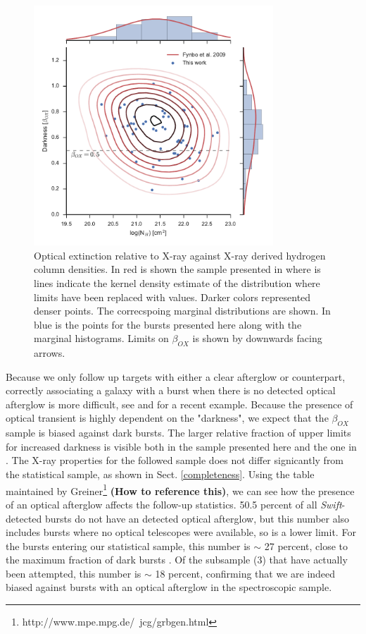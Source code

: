 \documentclass{aa}    %
\newcommand\todo[1]{\textbf{(#1)}}
\begin{document}
\begin{figure}
	\centerline{\includegraphics[width=9cm]{figures/betaOX.pdf}}
	\caption{Optical extinction relative to X-ray against X-ray derived hydrogen
	column densities. In red is shown the sample presented in \citet{Fynbo2009}
	where is lines indicate the kernel density estimate of the distribution where
	limits have been replaced with values. Darker colors represented denser points.
	The correcspoing marginal distributions are shown. In blue is the points for
	the bursts presented here along with the marginal histograms. Limits on
	$\beta_{OX}$ is shown by downwards facing arrows.}
	\label{fig:betaOX}
\end{figure}

Because we only follow up targets with either a clear afterglow or counterpart,
correctly associating a galaxy with a burst when there is no detected optical
afterglow is more difficult, see \citet{Levesque2010} and \citet{Perley2017} for
a recent example. Because the presence of optical transient is highly dependent
on the "darkness", we expect that the $\beta_{OX}$ sample is biased against dark
bursts. The larger relative fraction of upper limits for increased darkness is
visible both in the sample presented here and the one in \citet{Fynbo2009}. The
X-ray properties for the followed sample does not differ signicantly from the
statistical sample, as shown in Sect. \ref{completeness}. Using the table
maintained by Greiner\footnote{http://www.mpe.mpg.de/~jcg/grbgen.html} \todo{How
to reference this}, we can see how the presence of an optical afterglow affects
the follow-up statistics. 50.5 percent of all \textit{Swift}-detected bursts do
not have an detected optical afterglow, but this number also includes bursts
where no optical telescopes were available, so is a lower limit. For the bursts
entering our statistical sample, this number is $\sim$ 27 percent, close to the
maximum fraction of dark bursts \citep{Melandri2012}. Of the subsample (3) that
have actually been attempted, this number is $\sim$ 18 percent, confirming that
we are indeed biased against bursts with an optical afterglow in the
spectroscopic sample.
\end{document}
